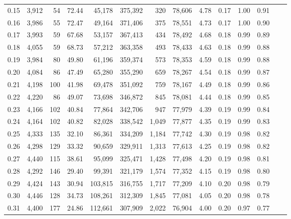 \begin{tabular}{rrrrrrrrrrrrrr}
0.15 &  3,912 &     54 &   72.44 &   45,178 &  375,392 &     320 &  78,606 &  4.78 &  0.17 &  1.00 &      0.91 \\
0.16 &  3,986 &     55 &   72.47 &   49,164 &  371,406 &     375 &  78,551 &  4.73 &  0.17 &  1.00 &      0.90 \\
0.17 &  3,993 &     59 &   67.68 &   53,157 &  367,413 &     434 &  78,492 &  4.68 &  0.18 &  0.99 &      0.89 \\
0.18 &  4,055 &     59 &   68.73 &   57,212 &  363,358 &     493 &  78,433 &  4.63 &  0.18 &  0.99 &      0.88 \\
0.19 &  3,984 &     80 &   49.80 &   61,196 &  359,374 &     573 &  78,353 &  4.59 &  0.18 &  0.99 &      0.88 \\
0.20 &  4,084 &     86 &   47.49 &   65,280 &  355,290 &     659 &  78,267 &  4.54 &  0.18 &  0.99 &      0.87 \\
0.21 &  4,198 &    100 &   41.98 &   69,478 &  351,092 &     759 &  78,167 &  4.49 &  0.18 &  0.99 &      0.86 \\
0.22 &  4,220 &     86 &   49.07 &   73,698 &  346,872 &     845 &  78,081 &  4.44 &  0.18 &  0.99 &      0.85 \\
0.23 &  4,166 &    102 &   40.84 &   77,864 &  342,706 &     947 &  77,979 &  4.39 &  0.19 &  0.99 &      0.84 \\
0.24 &  4,164 &    102 &   40.82 &   82,028 &  338,542 &   1,049 &  77,877 &  4.35 &  0.19 &  0.99 &      0.83 \\
0.25 &  4,333 &    135 &   32.10 &   86,361 &  334,209 &   1,184 &  77,742 &  4.30 &  0.19 &  0.98 &      0.82 \\
0.26 &  4,298 &    129 &   33.32 &   90,659 &  329,911 &   1,313 &  77,613 &  4.25 &  0.19 &  0.98 &      0.82 \\
0.27 &  4,440 &    115 &   38.61 &   95,099 &  325,471 &   1,428 &  77,498 &  4.20 &  0.19 &  0.98 &      0.81 \\
0.28 &  4,292 &    146 &   29.40 &   99,391 &  321,179 &   1,574 &  77,352 &  4.15 &  0.19 &  0.98 &      0.80 \\
0.29 &  4,424 &    143 &   30.94 &  103,815 &  316,755 &   1,717 &  77,209 &  4.10 &  0.20 &  0.98 &      0.79 \\
0.30 &  4,446 &    128 &   34.73 &  108,261 &  312,309 &   1,845 &  77,081 &  4.05 &  0.20 &  0.98 &      0.78 \\
0.31 &  4,400 &    177 &   24.86 &  112,661 &  307,909 &   2,022 &  76,904 &  4.00 &  0.20 &  0.97 &      0.77 \\

\end{tabular}
